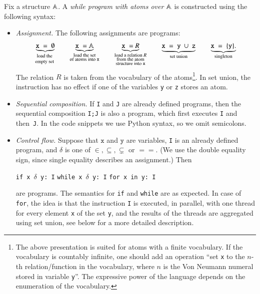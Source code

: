 \begin{definition}
	 Fix a structure $\mathbb A$. A \emph{while program with atoms over $\mathbb A$} is  constructed using the following syntax:
	\begin{itemize}
		\item \emph{Assignment.}   The following assignments are programs:
		\begin{align*}
			\myunderbrace{\mathtt{x\ = \ \emptyset}}{load the \\ empty set} \qquad 
			\underbrace{\mathtt{x\ =\ }\atoms}_{\substack{\text{load the set}\\ \text{of atoms into \texttt{x}}}} \qquad \underbrace{\mathtt{x\ =\ }R}_{\substack{\text{load a relation $R$}\\ \text{from the atom} \\ \text{structure into \texttt{x}}}} \qquad \underbrace{\mathtt{x\ =\ y\ \cup\ z}}_{\substack{\text{set union}}} \qquad \underbrace{\mathtt{x\ =\ \set y}.}_{\substack{\text{singleton}}}
		\end{align*}
		The relation $R$ is taken from the vocabulary of the atoms\footnote{The above presentation is suited for atoms with a finite vocabulary. If the vocabulary is countably infinite, one should add an operation ``set \texttt{x} to the $n$-th relation/function in the vocabulary, where $n$ is the Von Neumann numeral stored in variable \texttt{y}''. The expressive power of the language depends on the  enumeration of the vocabulary.}. In set union, the instruction has no effect if  one of the variables \texttt{y} or \texttt{z} stores an atom.
			\item \emph{Sequential composition.} If \texttt{I} and \texttt{J} are already defined programs, then the sequential composition \texttt{I;J} is also a program, which first executes \texttt{I} and then~\texttt{J}. In the code snippets we use Python syntax, so we omit semicolons.
		\item \emph{Control flow.}  Suppose that  $\mathtt x$ and $\mathtt y$ are variables,  \texttt{I} is an already defined program, and $\delta$ is one of $\in, \subseteq, \subsetneq$  or $==$. (We use the double equality sign, since   single equality describes an assignment.) Then 
	\begin{center}
		\texttt{if x $\delta$ y: I} \qquad \texttt{while x $\delta$ y: I} \qquad \texttt{for x in y: I}
	\end{center}
	are programs. The semantics for \texttt{if} and \texttt{while} are as expected. In case of \texttt{for},  the  idea is that the instruction \texttt{I} is executed, in parallel, with one thread for every element \texttt{x} of the set \texttt{y}, and the results of the threads are aggregated using set union, see below for a more detailed description.
	\end{itemize}
\end{definition}


